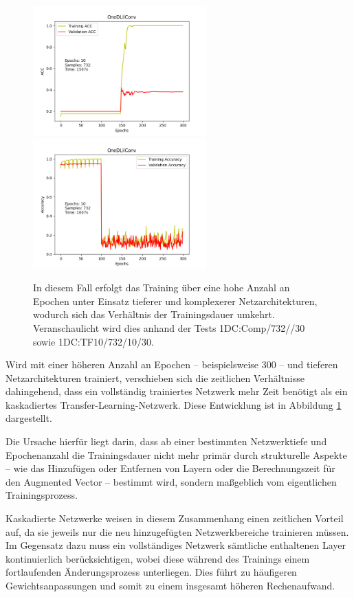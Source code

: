 \begin{figure}[htpb]
    \includegraphics[height=5cm]{../../Plots/ba_plots/classnocascade/1dc.png}
    \includegraphics[height=5cm]{../../Plots/ba_plots/classTF/1dc_tr.png}
    \caption{\label{fig:timeother} 
    \small{In diesem Fall erfolgt das Training über eine hohe Anzahl an Epochen unter Einsatz tieferer und komplexerer Netzarchitekturen, 
    wodurch sich das Verhältnis der Trainingsdauer umkehrt. Veranschaulicht wird dies anhand der Tests 1DC:Comp/732//30 sowie 1DC:TF10/732/10/30.}}
\end{figure}

Wird mit einer höheren Anzahl an Epochen – beispielsweise 300 – und tieferen Netzarchitekturen trainiert, verschieben sich die zeitlichen 
Verhältnisse dahingehend, dass ein vollständig trainiertes Netzwerk mehr Zeit benötigt als ein kaskadiertes Transfer-Learning-Netzwerk. Diese 
Entwicklung ist in Abbildung \ref{fig:timeother} dargestellt.

Die Ursache hierfür liegt darin, dass ab einer bestimmten Netzwerktiefe und Epochenanzahl die Trainingsdauer nicht mehr primär durch 
strukturelle Aspekte – wie das Hinzufügen oder Entfernen von Layern oder die Berechnungszeit für den Augmented Vector – bestimmt wird, 
sondern maßgeblich vom eigentlichen Trainingsprozess.

Kaskadierte Netzwerke weisen in diesem Zusammenhang einen zeitlichen Vorteil auf, da sie jeweils nur die neu hinzugefügten Netzwerkbereiche 
trainieren müssen. Im Gegensatz dazu muss ein vollständiges Netzwerk sämtliche enthaltenen Layer kontinuierlich berücksichtigen, wobei diese 
während des Trainings einem fortlaufenden Änderungsprozess unterliegen. Dies führt zu häufigeren Gewichtsanpassungen und somit zu einem 
insgesamt höheren Rechenaufwand.
